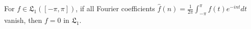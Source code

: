 For $f \in \mathfrak{L}_1([-\pi, \pi])$, if all Fourier coefficients $\hat{f}(n) = \frac{1}{2\pi} \int_{-\pi}^{\pi} f(t) e^{-int} dt$ vanish, then $f = 0$ in $\mathfrak{L}_1$.
